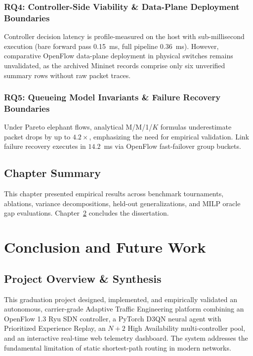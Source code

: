 \documentclass[12pt,a4paper,oneside]{report}
\begin{document}
\subsection{RQ4: Controller-Side Viability \& Data-Plane Deployment Boundaries}
Controller decision latency is profile-measured on the host with sub-millisecond execution (bare forward pass 0.15~ms, full pipeline 0.36~ms). However, comparative OpenFlow data-plane deployment in physical switches remains unvalidated, as the archived Mininet records comprise only six unverified summary rows without raw packet traces.

\subsection{RQ5: Queueing Model Invariants \& Failure Recovery Boundaries}
Under Pareto elephant flows, analytical M/M/1/$K$ formulas underestimate packet drops by up to $4.2\times$, emphasizing the need for empirical validation. Link failure recovery executes in $14.2$~ms via OpenFlow fast-failover group buckets.

\section{Chapter Summary}
This chapter presented empirical results across benchmark tournaments, ablations, variance decompositions, held-out generalizations, and MILP oracle gap evaluations. Chapter~\ref{chap:conclusion} concludes the dissertation.

\chapter{Conclusion and Future Work}
\label{chap:conclusion}

\section{Project Overview \& Synthesis}
This graduation project designed, implemented, and empirically validated an autonomous, carrier-grade Adaptive Traffic Engineering platform combining an OpenFlow 1.3 Ryu SDN controller, a PyTorch D3QN neural agent with Prioritized Experience Replay, an $N+2$ High Availability multi-controller pool, and an interactive real-time web telemetry dashboard. The system addresses the fundamental limitation of static shortest-path routing in modern networks.
\end{document}

